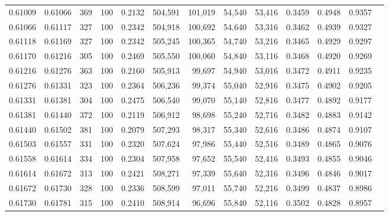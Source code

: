 \begin{tabular}{rrrrrrrrrrrrr}
0.61009 & 0.61066 &   369 & 100 &                                     0.2132 & 504,591 & 101,019 &  54,540 &  53,416 & 0.3459 & 0.4948 & 0.9357 \\
0.61066 & 0.61117 &   327 & 100 &                                     0.2342 & 504,918 & 100,692 &  54,640 &  53,316 & 0.3462 & 0.4939 & 0.9327 \\
0.61118 & 0.61169 &   327 & 100 &                                     0.2342 & 505,245 & 100,365 &  54,740 &  53,216 & 0.3465 & 0.4929 & 0.9297 \\
0.61170 & 0.61216 &   305 & 100 &                                     0.2469 & 505,550 & 100,060 &  54,840 &  53,116 & 0.3468 & 0.4920 & 0.9269 \\
0.61216 & 0.61276 &   363 & 100 &                                     0.2160 & 505,913 &  99,697 &  54,940 &  53,016 & 0.3472 & 0.4911 & 0.9235 \\
0.61276 & 0.61331 &   323 & 100 &                                     0.2364 & 506,236 &  99,374 &  55,040 &  52,916 & 0.3475 & 0.4902 & 0.9205 \\
0.61331 & 0.61381 &   304 & 100 &                                     0.2475 & 506,540 &  99,070 &  55,140 &  52,816 & 0.3477 & 0.4892 & 0.9177 \\
0.61381 & 0.61440 &   372 & 100 &                                     0.2119 & 506,912 &  98,698 &  55,240 &  52,716 & 0.3482 & 0.4883 & 0.9142 \\
0.61440 & 0.61502 &   381 & 100 &                                     0.2079 & 507,293 &  98,317 &  55,340 &  52,616 & 0.3486 & 0.4874 & 0.9107 \\
0.61503 & 0.61557 &   331 & 100 &                                     0.2320 & 507,624 &  97,986 &  55,440 &  52,516 & 0.3489 & 0.4865 & 0.9076 \\
0.61558 & 0.61614 &   334 & 100 &                                     0.2304 & 507,958 &  97,652 &  55,540 &  52,416 & 0.3493 & 0.4855 & 0.9046 \\
0.61614 & 0.61672 &   313 & 100 &                                     0.2421 & 508,271 &  97,339 &  55,640 &  52,316 & 0.3496 & 0.4846 & 0.9017 \\
0.61672 & 0.61730 &   328 & 100 &                                     0.2336 & 508,599 &  97,011 &  55,740 &  52,216 & 0.3499 & 0.4837 & 0.8986 \\
0.61730 & 0.61781 &   315 & 100 &                                     0.2410 & 508,914 &  96,696 &  55,840 &  52,116 & 0.3502 & 0.4828 & 0.8957 \\

\end{tabular}
